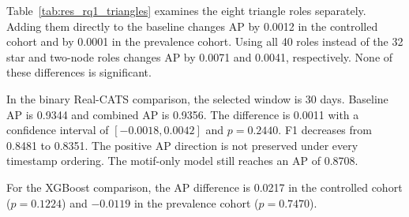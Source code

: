 
Table~\ref{tab:res_rq1_triangles} examines the eight triangle roles separately.
Adding them directly to the baseline changes AP by 0.0012 in the controlled
cohort and by 0.0001 in the prevalence cohort. Using all 40 roles instead of the
32 star and two-node roles changes AP by 0.0071 and 0.0041, respectively. None
of these differences is significant.


In the binary Real-CATS comparison, the selected window is 30 days.
Baseline AP is 0.9344 and combined AP is 0.9356.
The difference is 0.0011 with a confidence interval of $[-0.0018,0.0042]$ and
$p=0.2440$. F1 decreases from 0.8481 to 0.8351. The positive AP direction is not
preserved under every timestamp ordering. The motif-only model still reaches an
AP of 0.8708.


For the XGBoost comparison, the AP difference is 0.0217 in the controlled cohort
($p=0.1224$) and $-0.0119$ in the prevalence cohort ($p=0.7470$).

